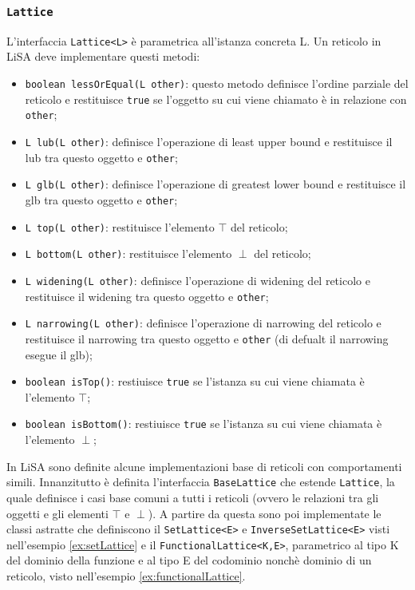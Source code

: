 \subsubsection{\texttt{Lattice}}\label{subsec:lattice}
L'interfaccia \texttt{Lattice<L>} è parametrica all'istanza concreta L. Un reticolo in LiSA deve implementare questi metodi:
\begin{itemize}
\setlength\itemsep{0.1em}
    \item \texttt{boolean lessOrEqual(L other)}: questo metodo definisce l'ordine parziale del reticolo e restituisce \texttt{true} se l'oggetto su cui viene chiamato è in relazione con \texttt{other};
    \item \texttt{L lub(L other)}: definisce l'operazione di least upper bound e restituisce il lub tra questo oggetto e \texttt{other};
    \item \texttt{L glb(L other)}: definisce l'operazione di greatest lower bound e restituisce il glb tra questo oggetto e \texttt{other};
    \item \texttt{L top(L other)}: restituisce l'elemento \(\top\) del reticolo;
    \item \texttt{L bottom(L other)}: restituisce l'elemento \(\perp\) del reticolo;
    \item \texttt{L widening(L other)}: definisce l'operazione di widening del reticolo e restituisce il widening tra questo oggetto e \texttt{other};
    \item \texttt{L narrowing(L other)}: definisce l'operazione di narrowing del reticolo e restituisce il narrowing tra questo oggetto e \texttt{other} (di defualt il narrowing esegue il glb);
    \item \texttt{boolean isTop()}: restiuisce \texttt{true} se l'istanza su cui viene chiamata è l'elemento \(\top\);
    \item \texttt{boolean isBottom()}: restiuisce \texttt{true} se l'istanza su cui viene chiamata è l'elemento \(\perp\);
\end{itemize}
In LiSA sono definite alcune implementazioni base di reticoli con comportamenti simili. Innanzitutto è definita l'interfaccia \texttt{BaseLattice} che estende \texttt{Lattice}, la quale definisce i casi base comuni a tutti i reticoli (ovvero le relazioni tra gli oggetti e gli elementi \(\top\) e \(\perp\)). A partire da questa sono poi implementate le classi astratte che definiscono il \texttt{SetLattice<E>} e \texttt{InverseSetLattice<E>} visti nell'esempio \ref{ex:setLattice} e il \texttt{FunctionalLattice<K,E>}, parametrico al tipo K del dominio della funzione e al tipo E del codominio nonchè dominio di un reticolo, visto nell'esempio \ref{ex:functionalLattice}. 


